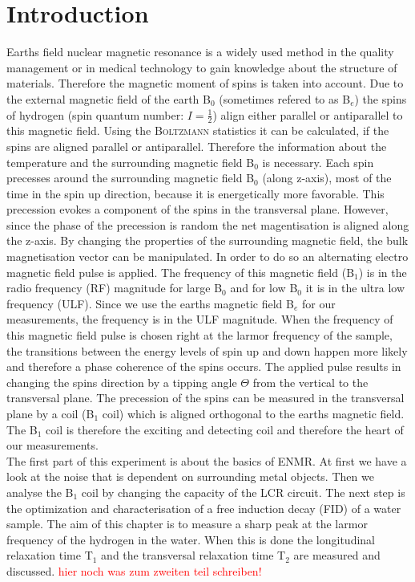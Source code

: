 \section{Introduction}
\label{sec:Introduction}
Earths field nuclear magnetic resonance is a widely used method in the quality management or in medical technology to gain knowledge about the structure of materials.
Therefore the magnetic moment of spins is taken into account.\newline
Due to the external magnetic field of the earth B$_0$ (sometimes refered to as B$_e$) the spins of hydrogen (spin quantum number: $I=\frac{1}{2}$) align either parallel or antiparallel to this magnetic field.
Using the \textsc{Boltzmann} statistics it can be calculated, if the spins are aligned parallel or antiparallel.
Therefore the information about the temperature and the surrounding magnetic field B$_0$ is necessary.
Each spin precesses around the surrounding magnetic field B$_0$ (along z-axis), most of the time in the spin up direction, because it is energetically more favorable.
This precession evokes a component of the spins in the transversal plane.
However, since the phase of the precession is random the net magentisation is aligned along the z-axis.
By changing the properties of the surrounding magnetic field, the bulk magnetisation vector can be manipulated.
In order to do so an alternating electro magnetic field pulse is applied.
The frequency of this magnetic field (B$_1$) is in the radio frequency (RF) magnitude for large B$_0$ and for low B$_0$ it is in the ultra low frequency (ULF).
Since we use the earths magnetic field B$_e$ for our measurements, the frequency is in the ULF magnitude.
When the frequency of this magnetic field pulse is chosen right at the larmor frequency of the sample, the transitions between the energy levels of spin up and down happen more likely and therefore a phase coherence of the spins occurs.
The applied pulse results in changing the spins direction by a tipping angle $\Theta$ from the vertical to the transversal plane.
The precession of the spins can be measured in the transversal plane by a coil (B$_1$ coil) which is aligned orthogonal to the earths magnetic field.
The B$_1$ coil is therefore the exciting and detecting coil and therefore the heart of our measurements. \\
The first part of this experiment is about the basics of ENMR.
At first we have a look at the noise that is dependent on surrounding metal objects.
Then we analyse the B$_1$ coil by changing the capacity of the LCR circuit.
The next step is the optimization and characterisation of a free induction decay (FID) of a water sample.
The aim of this chapter is to measure a sharp peak at the larmor frequency of the hydrogen in the water.
When this is done the longitudinal relaxation time T$_1$ and the transversal relaxation time T$_2$ are measured and discussed.
\textcolor{red}{hier noch was zum zweiten teil schreiben!}